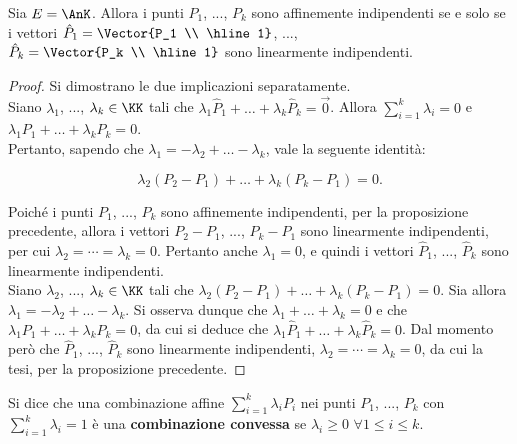 \documentclass[11pt]{article}
\begin{document}
	\begin{proposition}
		Sia $E = \AnK$. Allora i punti $P_1$, ..., $P_k$ sono affinemente indipendenti se e solo
		se i vettori $\hat P_1 = \Vector{P_1 \\ \hline 1}$, ..., $\hat P_k = \Vector{P_k \\ \hline 1}$ sono
		linearmente indipendenti.
	\end{proposition}
	
	\begin{proof}
		Si dimostrano le due implicazioni separatamente. \\
		
		\rightproof Siano $\lambda_1$, ..., $\lambda_k \in \KK$ tali che
		$\lambda_1 \hat P_1 + \ldots + \lambda_k \hat P_k = \vec 0$. Allora
		$\sum_{i=1}^k \lambda_i = 0$ e $\lambda_1 P_1 + \ldots + \lambda_k P_k = 0$. \\
		
		Pertanto, sapendo che $\lambda_1 = - \lambda_2 + \ldots - \lambda_k$, vale
		la seguente identità:
		
		\[ \lambda_2 (P_2 - P_1) + \ldots + \lambda_k (P_k - P_1) = 0. \]
		
		\vskip 0.05in
		
		Poiché i punti $P_1$, ..., $P_k$ sono affinemente indipendenti, per la proposizione precedente,
		allora i vettori $P_2 - P_1$, ..., $P_k - P_1$ sono linearmente indipendenti, per cui $\lambda_2 = \cdots = \lambda_k = 0$. Pertanto anche $\lambda_1 = 0$, e quindi i vettori $\hat P_1$, ..., $\hat P_k$ sono
		linearmente indipendenti. \\
		
		\leftproof Siano $\lambda_2$, ..., $\lambda_k \in \KK$ tali che
		$\lambda_2 (P_2 - P_1) + \ldots + \lambda_k (P_k - P_1) = 0$. Sia allora
		$\lambda_1 = - \lambda_2 + \ldots - \lambda_k$. Si osserva dunque
		che $\lambda_1 + \ldots + \lambda_k = 0$ e che $\lambda_1 P_1 + \ldots + \lambda_k P_k = 0$,
		da cui si deduce che $\lambda_1 \hat P_1 + \ldots + \lambda_k \hat P_k = 0$. Dal momento
		però che $\hat P_1$, ..., $\hat P_k$ sono linearmente indipendenti, $\lambda_2 = \cdots = \lambda_k = 0$,
		da cui la tesi, per la proposizione precedente.
	\end{proof}
	
	\begin{definition} 
		Si dice che una combinazione affine $\sum_{i=1}^k \lambda_i P_i$ nei punti $P_1$, ..., $P_k$ con
		$\sum_{i=1}^k \lambda_i = 1$ è
		una \textbf{combinazione convessa} se $\lambda_i \geq 0$ $\forall 1 \leq i \leq k$.
	\end{definition}
	
\end{document}
